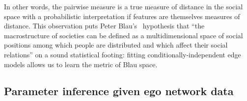 \documentclass{scrartcl}
\begin{document}
In other words, the pairwise measure is a true measure of distance in the social space with a probabilistic interpretation if features are themselves measures of distance.
This observation puts Peter Blau's~\cite{Blau1977} hypothesis that ``the macrostructure of societies can be defined as a multidimensional space of social positions among which people are distributed and which affect their social relations'' on a sound statistical footing: fitting conditionally-independent edge models allows us to learn the metric of Blau space.

\subsection{Parameter inference given ego network data}
\end{document}
